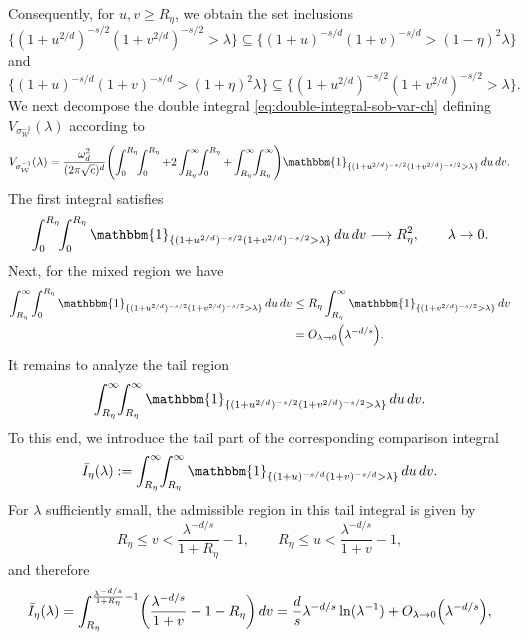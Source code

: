 \documentclass[a4paper,12pt]{article}
\let\originalleft\left
\let\originalright\right
\renewcommand{\left}{\mathopen{}\mathclose\bgroup\originalleft}
\renewcommand{\right}{\aftergroup\egroup\originalright}
\newcommand{\symbolnotsobw}{\symbolnot_{\mathcal{W}}}
\newcommand{\symbolnot}{\sigma}
\begin{document}
Consequently, for $u,v\ge R_\eta$, we obtain the set inclusions
\begin{equation}\label{eq:set-inclusion-1}
\{(1+u^{2/d})^{-s/2}(1+v^{2/d})^{-s/2}>\lambda\}
\subseteq
\{(1+u)^{-s/d}(1+v)^{-s/d}>(1-\eta)^2\lambda\}
\end{equation}
and
\begin{equation}\label{eq:set-inclusion-2}
\{(1+u)^{-s/d}(1+v)^{-s/d}>(1+\eta)^2\lambda\}
\subseteq
\{(1+u^{2/d})^{-s/2}(1+v^{2/d})^{-s/2}>\lambda\}.
\end{equation}
We next decompose the double integral \eqref{eq:double-integral-sob-var-ch} defining
$V_{\symbolnotsobw^{-1}}(\lambda)$ according to
\[
V_{\symbolnotsobw^{-1}}(\lambda)
=
\frac{\omega_d^2}{(2\pi\sqrt{c})^{d}}
\left(
\int_{0}^{R_\eta}\!\!\int_{0}^{R_\eta}
+
2\int_{R_\eta}^{\infty}\!\!\int_{0}^{R_\eta}
+
\int_{R_\eta}^{\infty}\!\!\int_{R_\eta}^{\infty}
\right)
\mathbbm{1}_{\{(1+u^{2/d})^{-s/2}(1+v^{2/d})^{-s/2}>\lambda\}}
\,du\,dv .
\]
The first integral satisfies
\begin{equation}\label{eq:first-integral}
\int_{0}^{R_\eta}\!\!\int_{0}^{R_\eta}
\mathbbm{1}_{\{(1+u^{2/d})^{-s/2}(1+v^{2/d})^{-s/2}>\lambda\}}
\,du\,dv
\longrightarrow
R_\eta^2,
\qquad \lambda\to0 .
\end{equation}
Next, for the mixed region we have
\begin{align}\label{eq:second-integral}
\int_{R_\eta}^{\infty}\!\int_{0}^{R_\eta}
\mathbbm{1}_{\{(1+u^{2/d})^{-s/2}(1+v^{2/d})^{-s/2}>\lambda\}}
\,du\,dv \nonumber
&\le
R_\eta
\int_{R_\eta}^{\infty}
\mathbbm{1}_{\{(1+v^{2/d})^{-s/2}>\lambda\}}\,dv \\
&=
O_{\lambda\to0} \left(\lambda^{-d/s}\right).
\end{align}
It remains to analyze the tail region
\[
\int_{R_\eta}^{\infty}\!\!\int_{R_\eta}^{\infty}
\mathbbm{1}_{\{(1+u^{2/d})^{-s/2}(1+v^{2/d})^{-s/2}>\lambda\}}
\,du\,dv .
\]
To this end, we introduce the tail part of the corresponding 
comparison integral
\[
\bar I_\eta(\lambda)
:=
\int_{R_\eta}^{\infty}\!\!\int_{R_\eta}^{\infty}
\mathbbm{1}_{\{(1+u)^{-s/d}(1+v)^{-s/d}>\lambda\}}
\,du\,dv .
\]
For $\lambda$ sufficiently small, the admissible region in this tail integral is given by
\[
R_\eta \le v < \frac{\lambda^{-d/s}}{1+R_\eta}-1,
\qquad
R_\eta \le u < \frac{\lambda^{-d/s}}{1+v}-1,
\]
and therefore
\[
\bar I_\eta(\lambda)
=
\int_{R_\eta}^{\frac{\lambda^{-d/s}}{1+R_\eta}-1}
\left(\frac{\lambda^{-d/s}}{1+v}-1-R_\eta\right)\,dv
=
\frac{d}{s}\lambda^{-d/s}\ln(\lambda^{-1})
+ O_{\lambda\to0} \left(\lambda^{-d/s}\right),
\]
\end{document}
